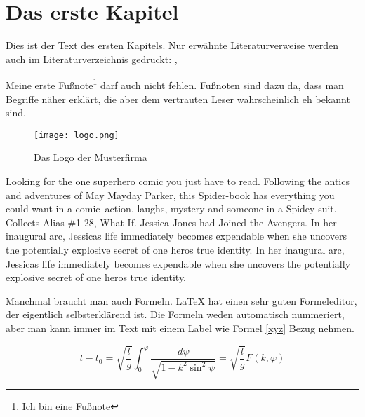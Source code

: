 
\chapter{Das erste Kapitel}
Dies ist der Text des ersten Kapitels. Nur erwähnte Literaturverweise werden auch im Literaturverzeichnis gedruckt: \cite[S.12 ff]{baumgartner:2002}, \cite[S.1-3]{dreyfus:1980}

Meine erste Fußnote\footnote{Ich bin eine Fußnote} darf auch nicht fehlen. Fußnoten sind dazu da, dass man Begriffe näher erklärt, die aber dem vertrauten Leser wahrscheinlich eh bekannt sind. 

\begin{figure}[h]
\centering
\texttt{[image: logo.png]}
\caption{Das Logo der Musterfirma\footnotemark}
\end{figure}



Looking for the one superhero comic you just have to read. Following the antics and adventures of May Mayday Parker, this Spider-book has everything you could want in a comic--action, laughs, mystery and someone in a Spidey suit. Collects Alias \#1-28, What If. Jessica Jones had Joined the Avengers. In her inaugural arc, Jessicas life immediately becomes expendable when she uncovers the potentially explosive secret of one heros true identity. In her inaugural arc, Jessicas life immediately becomes expendable when she uncovers the potentially explosive secret of one heros true identity.

Manchmal braucht man auch Formeln. LaTeX hat einen sehr guten Formeleditor, der eigentlich selbsterklärend ist. Die Formeln weden automatisch nummeriert, aber man kann immer im Text mit einem Label wie Formel \ref{xyz} Bezug nehmen.

\begin{equation}
t-t_{0}=\sqrt{\frac{l}{g}}\int_{0}^{\varphi}{\frac{d\psi}{\sqrt{1-k^{2}\sin^{2} {\psi}}}} = \sqrt{\frac{l}{g}} F(k,\varphi)
\label{xyz}
\end{equation}

